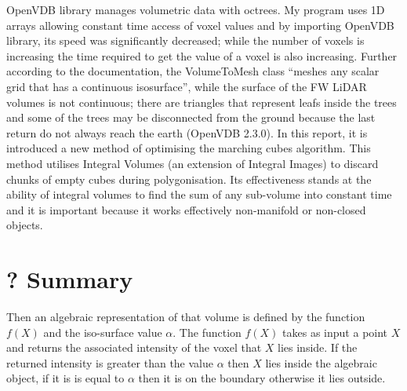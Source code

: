 \documentclass{subfiles}
\begin{document}
OpenVDB library manages volumetric data with octrees. My program uses 1D arrays allowing constant time access of voxel values and by importing OpenVDB library, its speed was significantly decreased; while the number of voxels is increasing the time required to get the value of a voxel is also increasing. Further according to the documentation, the VolumeToMesh class “meshes any scalar grid that has a continuous isosurface”, while the surface of the FW LiDAR volumes is not continuous; there are triangles that represent leafs inside the trees and some of the trees may be disconnected from the ground because the last return do not always reach the earth  (OpenVDB 2.3.0). \newline\newline
In this report, it is introduced a new method of optimising the marching cubes algorithm. This method utilises Integral Volumes (an extension of Integral Images) to discard chunks of empty cubes during polygonisation. Its effectiveness stands at the ability of integral volumes to find the sum of any sub-volume into constant time and it is important because it works effectively non-manifold or non-closed objects. \newline\newline

\section {? Summary}

Then an algebraic representation of that volume is defined by the function $f(X)$ and the iso-surface value $\alpha$. The function $f(X)$ takes as input a point $X$ and returns the associated intensity of the voxel that $X$ lies inside. If the returned intensity is greater than the value $\alpha$ then $X$ lies inside the algebraic object, if it is is equal to $\alpha$ then it is on the boundary otherwise it lies outside.
\end{document}
